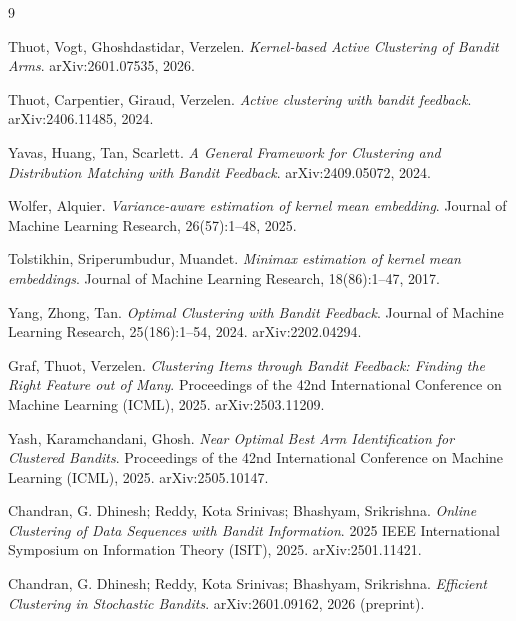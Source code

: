 \documentclass[11pt]{article}
\begin{document}
\begin{thebibliography}{9}

Thuot, Vogt, Ghoshdastidar, Verzelen.
\textit{Kernel-based Active Clustering of Bandit Arms}.
arXiv:2601.07535, 2026.

Thuot, Carpentier, Giraud, Verzelen.
\textit{Active clustering with bandit feedback}.
arXiv:2406.11485, 2024.

Yavas, Huang, Tan, Scarlett.
\textit{A General Framework for Clustering and Distribution Matching with Bandit Feedback}.
arXiv:2409.05072, 2024.

Wolfer, Alquier.
\textit{Variance-aware estimation of kernel mean embedding}.
Journal of Machine Learning Research, 26(57):1--48, 2025.

Tolstikhin, Sriperumbudur, Muandet.
\textit{Minimax estimation of kernel mean embeddings}.
Journal of Machine Learning Research, 18(86):1--47, 2017.

Yang, Zhong, Tan.
\textit{Optimal Clustering with Bandit Feedback}.
Journal of Machine Learning Research, 25(186):1--54, 2024. arXiv:2202.04294.

Graf, Thuot, Verzelen.
\textit{Clustering Items through Bandit Feedback: Finding the Right Feature out of Many}.
Proceedings of the 42nd International Conference on Machine Learning (ICML), 2025. arXiv:2503.11209.

Yash, Karamchandani, Ghosh.
\textit{Near Optimal Best Arm Identification for Clustered Bandits}.
Proceedings of the 42nd International Conference on Machine Learning (ICML), 2025. arXiv:2505.10147.

Chandran, G. Dhinesh; Reddy, Kota Srinivas; Bhashyam, Srikrishna.
\textit{Online Clustering of Data Sequences with Bandit Information}.
2025 IEEE International Symposium on Information Theory (ISIT), 2025. arXiv:2501.11421.

Chandran, G. Dhinesh; Reddy, Kota Srinivas; Bhashyam, Srikrishna.
\textit{Efficient Clustering in Stochastic Bandits}.
arXiv:2601.09162, 2026 (preprint).

\end{thebibliography}
\end{document}
